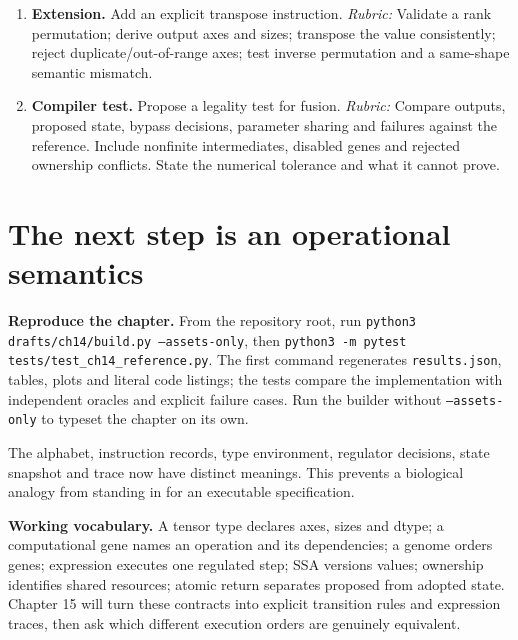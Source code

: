 \begin{enumerate}
A mutable label identifies no immutable artifact.
\item \textbf{Extension.} Add an explicit transpose instruction.
\textit{Rubric:} Validate a rank permutation; derive output axes and sizes;
transpose the value consistently; reject duplicate/out-of-range axes;
test inverse permutation and a same-shape semantic mismatch.
\item \textbf{Compiler test.} Propose a legality test for fusion.
\textit{Rubric:} Compare outputs, proposed state, bypass decisions,
parameter sharing and failures against the reference. Include nonfinite
intermediates, disabled genes and rejected ownership conflicts.
State the numerical tolerance and what it cannot prove.
\end{enumerate}

\section{The next step is an operational semantics}
\textbf{Reproduce the chapter.} From the repository root, run
\texttt{python3 drafts/ch14/build.py --assets-only}, then
\texttt{python3 -m pytest tests/test\_ch14\_reference.py}.
The first command regenerates \texttt{results.json}, tables, plots and literal
code listings; the tests compare the implementation with independent
oracles and explicit failure cases. Run the builder without
\texttt{--assets-only} to typeset the chapter on its own.

The alphabet, instruction records, type environment, regulator decisions,
state snapshot and trace now have distinct meanings. This prevents a
biological analogy from standing in for an executable specification.

\textbf{Working vocabulary.} A tensor type declares axes, sizes and dtype;
a computational gene names an operation and its dependencies; a genome
orders genes; expression executes one regulated step; SSA versions values;
ownership identifies shared resources; atomic return separates proposed
from adopted state. Chapter 15 will turn these contracts into explicit
transition rules and expression traces, then ask which different execution
orders are genuinely equivalent.
